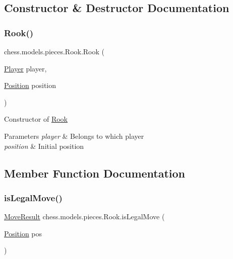 \subsection{Constructor \& Destructor Documentation}
\mbox{\label{classchess_1_1models_1_1pieces_1_1_rook_a6a09ddec79bb71f7b497e0faf8b02152}} 
\subsubsection{\texorpdfstring{Rook()}{Rook()}}
{\footnotesize\ttfamily chess.\+models.\+pieces.\+Rook.\+Rook (\begin{DoxyParamCaption}\item[{\mbox{\hyperlink{enumchess_1_1models_1_1enums_1_1_player}{Player}}}]{player,  }\item[{\mbox{\hyperlink{classchess_1_1models_1_1_position}{Position}}}]{position }\end{DoxyParamCaption})}

Constructor of \mbox{\hyperlink{classchess_1_1models_1_1pieces_1_1_rook}{Rook}}


\begin{DoxyParams}{Parameters}
{\em player} & Belongs to which player \\
\hline
{\em position} & Initial position \\
\hline
\end{DoxyParams}


\subsection{Member Function Documentation}
\mbox{\label{classchess_1_1models_1_1pieces_1_1_rook_adf20fa1c361d9122cae9fd20f543f8e4}} 
\subsubsection{\texorpdfstring{is\+Legal\+Move()}{isLegalMove()}}
{\footnotesize\ttfamily \mbox{\hyperlink{enumchess_1_1models_1_1enums_1_1_move_result}{Move\+Result}} chess.\+models.\+pieces.\+Rook.\+is\+Legal\+Move (\begin{DoxyParamCaption}\item[{\mbox{\hyperlink{classchess_1_1models_1_1_position}{Position}}}]{pos }\end{DoxyParamCaption})}


